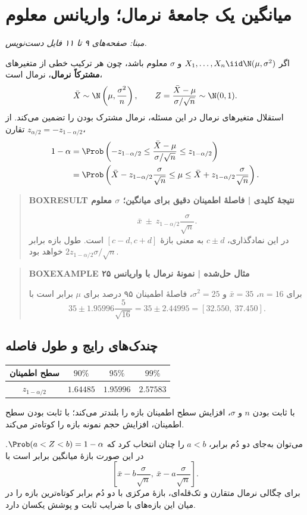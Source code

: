 \section{میانگین یک جامعهٔ نرمال؛ واریانس معلوم}
\textit{مبنا: صفحه‌های ۹ تا ۱۱ فایل دست‌نویس.}\par 
اگر $X_1,\ldots,X_n\iid\N(\mu,\sigma^2)$ و $\sigma$ معلوم باشد، چون هر ترکیب خطی از متغیرهای \textbf{مشترکاً نرمال}، نرمال است،
\[
\bar X\sim\N\left(\mu,\frac{\sigma^2}{n}\right),\qquad
Z=\frac{\bar X-\mu}{\sigma/\sqrt n}\sim\N(0,1).
\]
استقلال متغیرهای نرمال در این مسئله، نرمال مشترک بودن را تضمین می‌کند. از تقارن $z_{\alpha/2}=-z_{1-\alpha/2}$،
\begin{align*}
1-\alpha
&=\Prob\left(-z_{1-\alpha/2}\le\frac{\bar X-\mu}{\sigma/\sqrt n}\le z_{1-\alpha/2}\right)\\
&=\Prob\left(\bar X-z_{1-\alpha/2}\frac\sigma{\sqrt n}
\le\mu\le\bar X+z_{1-\alpha/2}\frac\sigma{\sqrt n}\right).
\end{align*}
\begin{quote}\textbf{BOXRESULT نتیجهٔ کلیدی | فاصلهٔ اطمینان دقیق برای میانگین؛ $\sigma$ معلوم}\par 
\[
\boxed{\bar x\ \pm\ z_{1-\alpha/2}\frac\sigma{\sqrt n}.}
\]
در این نمادگذاری، $c\pm d$ به معنی بازهٔ $[c-d,c+d]$ است. طول بازه برابر $2z_{1-\alpha/2}\sigma/\sqrt n$ خواهد بود.
\end{quote}
\begin{quote}\textbf{BOXEXAMPLE مثال حل‌شده | نمونهٔ نرمال با واریانس ۲۵}\par 
برای $n=16$، $\bar x=35$ و $\sigma^2=25$، فاصلهٔ اطمینان ۹۵ درصد برای $\mu$ برابر است با
\[
35\pm1.95996\frac5{\sqrt{16}}
=35\pm2.44995
=\boxed{[32.550,\ 37.450]}.
\]
\end{quote}
\subsection{چندک‌های رایج و طول فاصله}

\begin{tabular}{c|ccc}
\toprule
سطح اطمینان&$90\%$&$95\%$&$99\%$\\
\midrule
$z_{1-\alpha/2}$&$1.64485$&$1.95996$&$2.57583$\\
\bottomrule
\end{tabular}

با ثابت بودن $n$ و $\sigma$، افزایش سطح اطمینان بازه را بلندتر می‌کند؛ با ثابت بودن سطح اطمینان، افزایش حجم نمونه بازه را کوتاه‌تر می‌کند.

می‌توان به‌جای دو دُم برابر، $a<b$ را چنان انتخاب کرد که $\Prob(a<Z<b)=1-\alpha$. در این صورت بازهٔ میانگین برابر است با
\[\left[\bar x-b\frac\sigma{\sqrt n},\ \bar x-a\frac\sigma{\sqrt n}\right].\]
برای چگالی نرمال متقارن و تک‌قله‌ای، بازهٔ مرکزی با دو دُم برابر کوتاه‌ترین بازه را در میان این بازه‌های با ضرایب ثابت و پوشش یکسان دارد.
